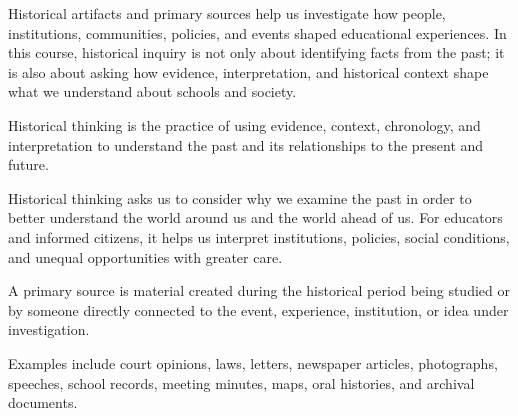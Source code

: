 \documentclass[
  letterpaper,
  DIV=11,
  numbers=noendperiod]{scrartcl}
\begin{document}
Historical artifacts and primary sources help us investigate how people,
institutions, communities, policies, and events shaped educational
experiences. In this course, historical inquiry is not only about
identifying facts from the past; it is also about asking how evidence,
interpretation, and historical context shape what we understand about
schools and society.

\begin{tcolorbox}[enhanced jigsaw, colframe=quarto-callout-note-color-frame, rightrule=.15mm, opacitybacktitle=0.6, leftrule=.75mm, colback=white, breakable, coltitle=black, arc=.35mm, bottomrule=.15mm, titlerule=0mm, left=2mm, colbacktitle=quarto-callout-note-color!10!white, title=\textcolor{quarto-callout-note-color}{\faInfo}\hspace{0.5em}{Historical thinking}, toprule=.15mm, bottomtitle=1mm, toptitle=1mm, opacityback=0]

Historical thinking is the practice of using evidence, context,
chronology, and interpretation to understand the past and its
relationships to the present and future.

Historical thinking asks us to consider why we examine the past in order
to better understand the world around us and the world ahead of us. For
educators and informed citizens, it helps us interpret institutions,
policies, social conditions, and unequal opportunities with greater
care.

\end{tcolorbox}

\begin{tcolorbox}[enhanced jigsaw, colframe=quarto-callout-tip-color-frame, rightrule=.15mm, opacitybacktitle=0.6, leftrule=.75mm, colback=white, breakable, coltitle=black, arc=.35mm, bottomrule=.15mm, titlerule=0mm, left=2mm, colbacktitle=quarto-callout-tip-color!10!white, title=\textcolor{quarto-callout-tip-color}{\faLightbulb}\hspace{0.5em}{Primary source}, toprule=.15mm, bottomtitle=1mm, toptitle=1mm, opacityback=0]

A primary source is material created during the historical period being
studied or by someone directly connected to the event, experience,
institution, or idea under investigation.

Examples include court opinions, laws, letters, newspaper articles,
photographs, speeches, school records, meeting minutes, maps, oral
histories, and archival documents.

\end{tcolorbox}
\end{document}
